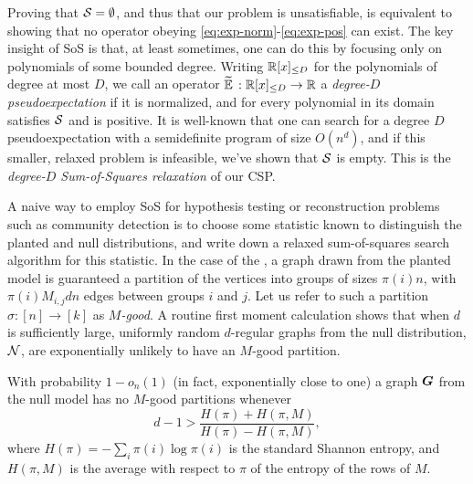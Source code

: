 Proving that $\mathcal{S} = \emptyset$, and thus that our problem is unsatisfiable, is equivalent to showing that no operator obeying \eqref{eq:exp-norm}-\eqref{eq:exp-pos} can exist. The key insight of SoS is that, at least sometimes, one can do this by focusing only on polynomials of some bounded degree. Writing $\mathbb{R}[x]_{\le D}$ for the polynomials of degree at most $D$, we call an operator $\widetilde{\operatorname*{\mathbb{E}}}\, : \mathbb{R}[x]_{\le D} \to \mathbb{R}$ a \emph{degree-$D$ pseudoexpectation} if it is normalized, and for every polynomial in its domain satisfies $\mathcal{S}$ and is positive. It is well-known that one can search for a degree $D$ pseudoexpectation with a semidefinite program of size $O(n^d)$, and if this smaller, relaxed problem is infeasible, we've shown that $\mathcal{S}$ is empty. This is the \emph{degree-$D$ Sum-of-Squares relaxation} of our CSP.

A naive way to employ SoS for hypothesis testing or reconstruction problems such as community detection is to choose some statistic known to distinguish the planted and null distributions, and write down a relaxed sum-of-squares search algorithm for this statistic. In the case of the \model, a graph drawn from the planted model is guaranteed a partition of the vertices into groups of sizes $\pi(i)n$, with $\pi(i)M_{i,j}dn$ edges between groups $i$ and $j$. Let us refer to such a partition $\sigma : [n] \to [k]$ as \emph{$M$-good}. A routine first moment calculation shows that when $d$ is sufficiently large, uniformly random $d$-regular graphs from the null distribution, $\mathcal{N}$, are exponentially unlikely to have an $M$-good partition.
%
\begin{proposition}
	With probability $1 - o_n(1)$ (in fact, exponentially close to one) a graph $\boldsymbol{G}$ from the null model has no $M$-good partitions whenever
	\begin{equation}
	    d-1 > \frac{H(\pi) + H(\pi,M)}{H(\pi) - H(\pi,M)},
	\end{equation}
	where $H(\pi) = -\sum_i\pi(i)\log\pi(i)$ is the standard Shannon entropy, and $H(\pi,M)$ is the average with respect to $\pi$ of the entropy of the rows of $M$.
\end{proposition}

